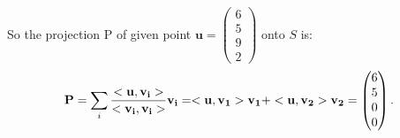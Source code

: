 \documentclass[twoside,11pt]{homework}
\begin{document}
So the projection P of given point $\mathbf{u} = \left(\begin{smallmatrix} 6\\5\\9\\2 \end{smallmatrix}\right)$ onto $S$ is:
%
\begin{equation}
\mathbf{P} = \sum_i \frac{<\bf{u}, \bf{v_i}>}{\bf{<v_i, v_i>}} \bf{v_i} = <\bf{u}, \bf{v_1}> \bf{v_1} +  <\bf{u}, \bf{v_2}> \bf{v_2} = \left(\begin{matrix} 6\\5\\0\\0 \end{matrix}\right).
\end{equation}
%


\end{document}
